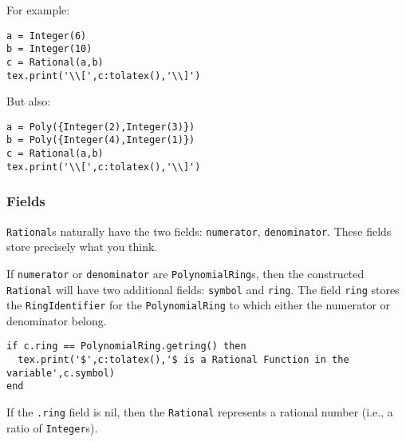 \documentclass{article}
\begin{document}
For example:
\begin{codebox}
    \begin{verbatim}
a = Integer(6)
b = Integer(10)
c = Rational(a,b)
tex.print('\\[',c:tolatex(),'\\]')
\end{verbatim}
\tcblower
{}
\end{codebox}
But also:
\begin{codebox}
    \begin{verbatim}
a = Poly({Integer(2),Integer(3)})
b = Poly({Integer(4),Integer(1)})
c = Rational(a,b)
tex.print('\\[',c:tolatex(),'\\]')
\end{verbatim}
\tcblower
{}
\end{codebox}

\subsubsection*{Fields}

\texttt{Rational}s naturally have the two fields: \texttt{numerator}, \texttt{denominator}. These fields store precisely what you think.

If \texttt{numerator} or \texttt{denominator} are \texttt{PolynomialRing}s, then the constructed \texttt{Rational} will have two additional fields: \texttt{symbol} and \texttt{ring}. The field \texttt{ring} stores the \texttt{RingIdentifier} for the \texttt{PolynomialRing} to which either the numerator or denominator belong.

\begin{codebox}[]
    \begin{verbatim}
if c.ring == PolynomialRing.getring() then 
  tex.print('$',c:tolatex(),'$ is a Rational Function in the variable',c.symbol)
end
\end{verbatim}
\tcblower
{}
\end{codebox}
If the \texttt{.ring} field is nil, then the \texttt{Rational} represents a rational number (i.e., a ratio of \texttt{Integer}s). 
\end{document}
